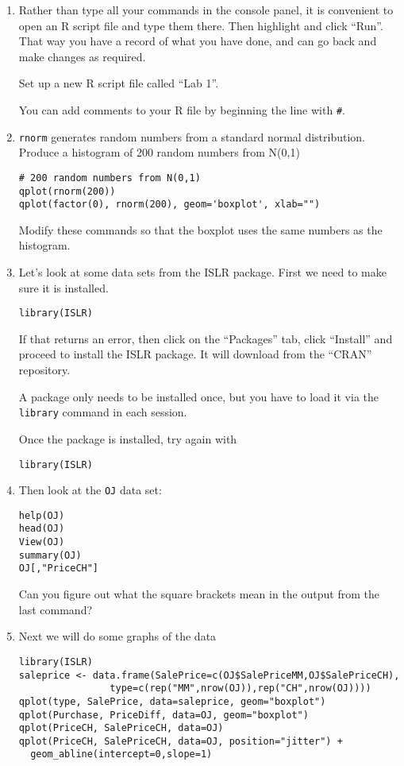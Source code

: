 \documentclass[11pt]{article}
\begin{document}
\begin{enumerate}
\item Rather than type all your commands in the console panel, it is convenient to open an R script file and type them there. Then highlight and click ``Run''. That way you have a record of what you have done, and can go back and make changes as required.

Set up a new R script file called ``Lab 1''.

You can add comments to your R file by beginning the line with \verb|#|.

\item \verb|rnorm| generates random numbers from a standard normal distribution. 
Produce a histogram of 200 random numbers from N(0,1)
\begin{verbatim}
# 200 random numbers from N(0,1)
qplot(rnorm(200)) 
qplot(factor(0), rnorm(200), geom='boxplot', xlab="")
\end{verbatim}
Modify these commands so that the boxplot uses the same numbers as the histogram.

\item  Let's look at some data sets from the ISLR package. First we need to make sure it is installed.
\begin{verbatim}
library(ISLR)
\end{verbatim}
If that returns an error, then click on the ``Packages'' tab, click ``Install'' and proceed to install the ISLR package. It will download from the ``CRAN'' repository.

A package only needs to be installed once, but you have to load it via the \verb|library| command in each session.

Once the package is installed, try again with 
\begin{verbatim}
library(ISLR)
\end{verbatim}

\item Then look at the \verb|OJ| data set:
\begin{verbatim}
help(OJ)
head(OJ)
View(OJ)
summary(OJ)
OJ[,"PriceCH"]
\end{verbatim}

Can you figure out what the square brackets mean in the output from the last command?

\item Next we will do some graphs of the data
\begin{verbatim}
library(ISLR)
saleprice <- data.frame(SalePrice=c(OJ$SalePriceMM,OJ$SalePriceCH),
                type=c(rep("MM",nrow(OJ)),rep("CH",nrow(OJ))))
qplot(type, SalePrice, data=saleprice, geom="boxplot")
qplot(Purchase, PriceDiff, data=OJ, geom="boxplot")
qplot(PriceCH, SalePriceCH, data=OJ)
qplot(PriceCH, SalePriceCH, data=OJ, position="jitter") + 
  geom_abline(intercept=0,slope=1)


\end{verbatim}
\end{enumerate}
\end{document}
